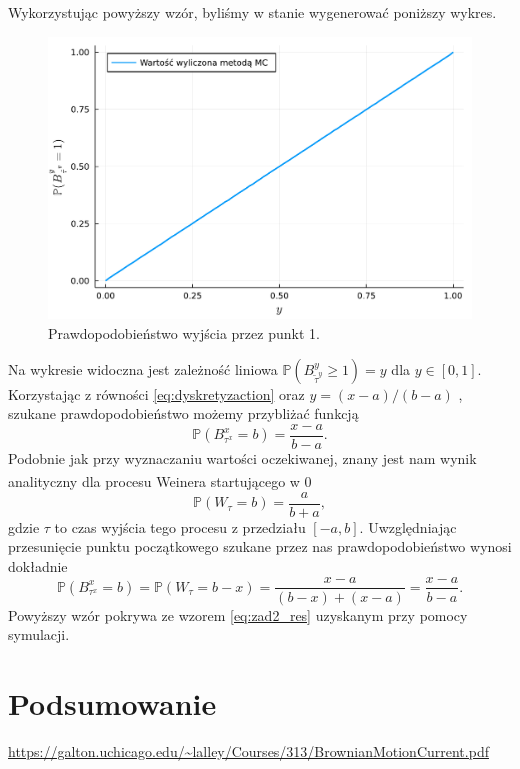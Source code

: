 \documentclass[12pt]{mwart}
\begin{document}
	 Wykorzystując powyższy wzór, byliśmy w stanie wygenerować poniższy wykres.
	\begin{figure}[H]
		\includegraphics[width=\columnwidth]{fig/plot/prob.pdf}
		\caption{Prawdopodobieństwo wyjścia przez punkt 1.}
	\end{figure}
	\noindent Na wykresie widoczna jest zależność liniowa $\mathbb{P}\left(B^y_{\widetilde{\tau}^y}\geqslant1\right) = y$ dla $y\in[0, 1]$. Korzystając z równości \eqref{eq:dyskretyzaction} oraz $y=(x-a)/(b-a)$ , szukane prawdopodobieństwo możemy przybliżać funkcją
	\begin{equation}\label{eq:zad2_res}
		\mathbb{P}\left(B^x_{{\tau}^x}= b\right)=\frac{x-a}{b-a}.
	\end{equation}
	Podobnie jak przy wyznaczaniu wartości oczekiwanej, znany jest nam wynik analityczny\textsuperscript{\cite{art}} dla procesu Weinera startującego w 0
	\begin{equation*}
		\mathbb{P}\left(W_{\tau}=b\right)=\frac{a}{b+a},
	\end{equation*}
	gdzie $\tau$ to czas wyjścia tego procesu z przedziału $[-a, b]$. Uwzględniając przesunięcie punktu początkowego szukane przez nas prawdopodobieństwo wynosi dokładnie
	\begin{equation*}
			\mathbb{P}\left(B^x_{\tau^x}=b\right)=\mathbb{P}\left(W_{\tau}=b-x\right)=\frac{x-a}{(b-x)+(x-a)}=\frac{x-a}{b-a}.
	\end{equation*}
	Powyższy wzór pokrywa ze wzorem \eqref{eq:zad2_res} uzyskanym przy pomocy symulacji.









	
	\section{Podsumowanie}
	
	
	
	\newpage
	\begin{thebibliography}{1}
		\url{}
		
		\url{https://galton.uchicago.edu/~lalley/Courses/313/BrownianMotionCurrent.pdf}
	\end{thebibliography}
\end{document}
